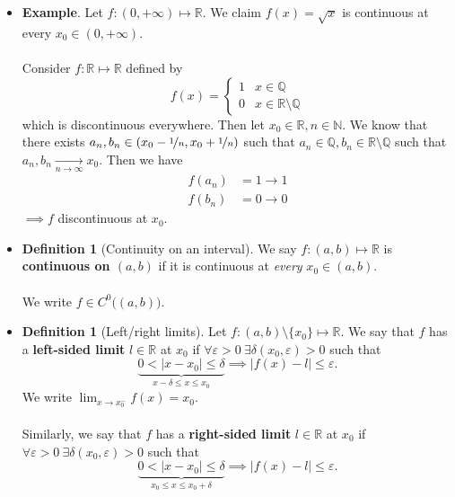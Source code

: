 \documentclass{article}
\newcommand{\Q}{\mathbb{Q}}
\newcommand{\R}{\mathbb{R}}
\newcommand{\N}{\mathbb{N}}
\newcommand{\?}{\stackrel{?}{=}}
\theoremstyle{definition} %
\newtheorem{definition}[subsection]{Definition} %
\begin{document}
\begin{itemize}
    \item \textbf{Example}. Let $f: (0, +\infty) \mapsto \R$. We claim $f(x) = \sqrt{x}$ is continuous at every $x_0 \in (0, +\infty)$. \\\\
          Consider $f: \R \mapsto \R$ defined by
          \[
              f(x) =
              \begin{cases}
                  1 & x \in \Q              \\
                  0 & x \in \R \setminus \Q
              \end{cases}
          \]
          which is discontinuous everywhere. Then let $x_0 \in \R, n \in \N$. We know that there exists $a_n, b_n \in (x_0 - \nicefrac{1}{n}, x_0 + \nicefrac{1}{n})$ such that $a_n \in \Q, b_n \in \R \setminus \Q$ such that $a_n, b_n \underset{n \rightarrow \infty}{\longrightarrow} x_0$. Then we have
          \begin{align*}
              f(a_n) & = 1 \rightarrow 1 \\
              f(b_n) & = 0 \rightarrow 0
          \end{align*}
          $\implies f$ discontinuous at $x_0$.
    \item[]
          \begin{definition}[Continuity on an interval]
              We say $f: (a, b) \mapsto \R$ is \textbf{continuous on $(a, b)$} if it is continuous at \textit{every} $x_0 \in (a, b)$. \\\\
              We write $f \in C^0 \big((a, b)\big)$.
          \end{definition}
    \item[]
          \begin{definition}[Left/right limits]
              Let $f: (a, b) \setminus \{x_0\} \mapsto \R$. We say that $f$ has a \textbf{left-sided limit} $l \in \R$ at $x_0$ if $\forall \varepsilon > 0 \ \exists \delta(x_0, \varepsilon) > 0$ such that
              $$\underbrace{0 < |x - x_0| \leq \delta}_{x - \delta \leq x \leq x_0} \implies |f(x) - l| \leq \varepsilon.$$
              We write $\lim_{x \to x_0^-} f(x) = x_0$. \\\\
              Similarly, we say that $f$ has a \textbf{right-sided limit} $l \in \R$ at $x_0$ if $\forall \varepsilon > 0 \ \exists \delta(x_0, \varepsilon) > 0$ such that
              $$\underbrace{0 < |x - x_0| \leq \delta}_{x_0 \leq x \leq x_0 + \delta} \implies |f(x) - l| \leq \varepsilon.$$

\end{definition}
\end{itemize}
\end{document}
